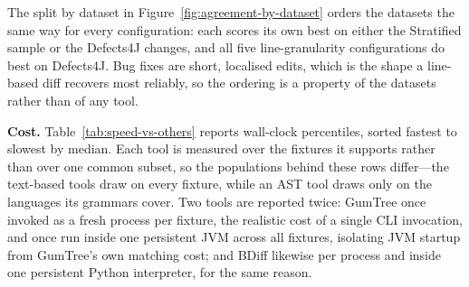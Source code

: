 \documentclass[sigconf]{acmart}
\begin{document}
The split by dataset in Figure~\ref{fig:agreement-by-dataset} orders the datasets the same way for
every configuration: each scores its own best on either the Stratified sample or the Defects4J
changes, and all five line-granularity configurations do best on Defects4J. Bug fixes are short,
localised edits, which is the shape a line-based diff recovers most reliably, so the ordering is a
property of the datasets rather than of any tool.

\textbf{Cost.} Table~\ref{tab:speed-vs-others} reports wall-clock percentiles, sorted fastest to slowest by median. Each tool is measured over
the fixtures it supports rather than over one common subset, so the populations behind these rows
differ---the text-based tools draw on every fixture, while an AST tool draws only on the languages
its grammars cover. Two tools are reported twice: GumTree once invoked as a fresh process per fixture, the realistic cost of a single CLI
invocation, and once run inside one persistent JVM across all fixtures, isolating JVM startup from
GumTree's own matching cost; and BDiff likewise per process and inside one persistent Python
interpreter, for the same reason.
\end{document}

